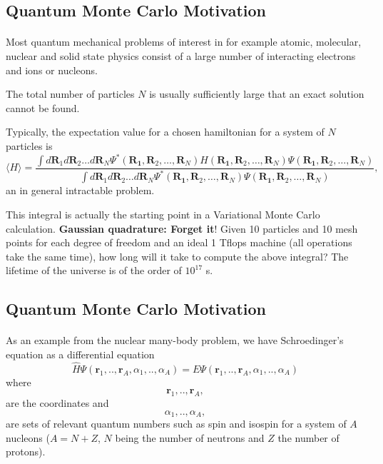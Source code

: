 \documentclass[%
twoside,                 %
final,                   %
10pt]{article}
\begin{document}
\noindent





\subsection{Quantum Monte Carlo Motivation}

\paragraph{}
Most quantum mechanical  problems of interest in for example atomic, molecular, nuclear and solid state 
physics consist of a large number of interacting electrons and ions or nucleons. 

The total number of particles $N$ is usually sufficiently large
that an exact solution cannot be found. 

Typically, 
the expectation value for a chosen hamiltonian for a system of  $N$ particles is
\[
   \langle H \rangle =
   \frac{\int d\bm{R}_1d\bm{R}_2\dots d\bm{R}_N
         \Psi^{\ast}(\bm{R_1},\bm{R}_2,\dots,\bm{R}_N)
          H(\bm{R_1},\bm{R}_2,\dots,\bm{R}_N)
          \Psi(\bm{R_1},\bm{R}_2,\dots,\bm{R}_N)}
        {\int d\bm{R}_1d\bm{R}_2\dots d\bm{R}_N
        \Psi^{\ast}(\bm{R_1},\bm{R}_2,\dots,\bm{R}_N)
        \Psi(\bm{R_1},\bm{R}_2,\dots,\bm{R}_N)},
\]
an in general intractable problem.

 This integral is actually the starting point in a Variational Monte Carlo calculation. \textbf{Gaussian quadrature: Forget it}! Given 10 particles and 10 mesh points for each degree of freedom
and an
 ideal 1 Tflops machine (all operations take the same time), how long will it take to compute the above integral? The lifetime of the universe is of the order of $10^{17}$ s.




\subsection{Quantum Monte Carlo Motivation}

\paragraph{}
As an example from the nuclear many-body problem, we have Schroedinger's equation as a differential equation
\[
  \hat{H}\Psi(\bm{r}_1,..,\bm{r}_A,\alpha_1,..,\alpha_A)=E\Psi(\bm{r}_1,..,\bm{r}_A,\alpha_1,..,\alpha_A)
\]
where
\[
  \bm{r}_1,..,\bm{r}_A,
\]
are the coordinates and 
\[
  \alpha_1,..,\alpha_A,
\]
are sets of relevant quantum numbers such as spin and isospin for a system of  $A$ nucleons ($A=N+Z$, $N$ being the number of neutrons and $Z$ the number of protons).
\end{document}
